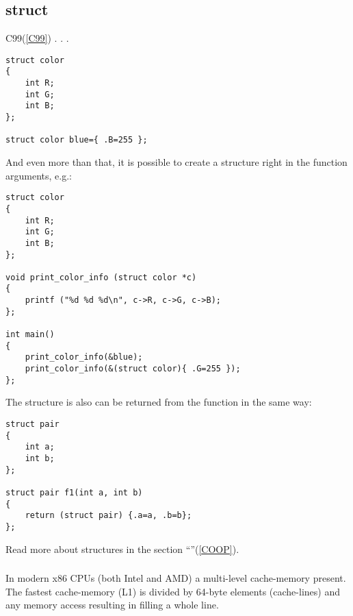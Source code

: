 ﻿\subsection{struct}

 C99(\ref{C99}) .
.
.

\begin{lstlisting}
struct color
{
	int R;
	int G;
	int B;
};

struct color blue={ .B=255 };
\end{lstlisting}

{And even more than that, it is possible to create a structure right in the function arguments, e.g.}:

\begin{lstlisting}
struct color
{
	int R;
	int G;
	int B;
};

void print_color_info (struct color *c)
{
	printf ("%d %d %d\n", c->R, c->G, c->B);
};

int main()
{
	print_color_info(&blue);
	print_color_info(&(struct color){ .G=255 });
};
\end{lstlisting}

{The structure is also can be returned from the function in the same way}:

\begin{lstlisting}
struct pair
{
	int a;
	int b;
};

struct pair f1(int a, int b)
{
	return (struct pair) {.a=a, .b=b};
};
\end{lstlisting}

{Read more about structures in the section} ``\COOPname''(\ref{COOP}).

\subsubsection{}

{In modern x86 CPUs (both Intel and AMD) a multi-level cache-memory present}.
{The fastest cache-memory (L1) is divided by 64-byte elements (cache-lines) and any
memory access resulting in filling a whole line}\cite{AgnerFog}.

